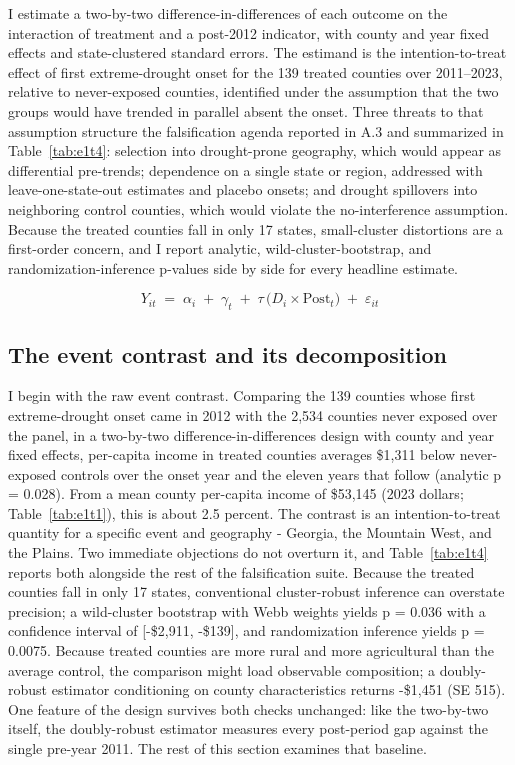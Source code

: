 \documentclass[a4paper,11pt]{article}
\begin{document}
I estimate a two-by-two difference-in-differences of each outcome on the interaction of treatment and a post-2012 indicator, with county and year fixed effects and state-clustered standard errors. The estimand is the intention-to-treat effect of first extreme-drought onset for the 139 treated counties over 2011--2023, relative to never-exposed counties, identified under the assumption that the two groups would have trended in parallel absent the onset. Three threats to that assumption structure the falsification agenda reported in A.3 and summarized in Table~\ref{tab:e1t4}: selection into drought-prone geography, which would appear as differential pre-trends; dependence on a single state or region, addressed with leave-one-state-out estimates and placebo onsets; and drought spillovers into neighboring control counties, which would violate the no-interference assumption. Because the treated counties fall in only 17 states, small-cluster distortions are a first-order concern, and I report analytic, wild-cluster-bootstrap, and randomization-inference p-values side by side for every headline estimate.

\begin{equation}
Y_{it} \;=\; \alpha_i \;+\; \gamma_t \;+\; \tau \,\bigl(D_i \times \mathrm{Post}_t\bigr)
\;+\; \varepsilon_{it}
\label{eq:did2x2}
\end{equation}

\FloatBarrier
\subsection{The event contrast and its decomposition}

I begin with the raw event contrast. Comparing the 139 counties whose first extreme-drought onset came in 2012 with the 2,534 counties never exposed over the panel, in a two-by-two difference-in-differences design with county and year fixed effects, per-capita income in treated counties averages \$1,311 below never-exposed controls over the onset year and the eleven years that follow (analytic p = 0.028). From a mean county per-capita income of \$53,145 (2023 dollars; Table~\ref{tab:e1t1}), this is about 2.5 percent. The contrast is an intention-to-treat quantity for a specific event and geography - Georgia, the Mountain West, and the Plains. Two immediate objections do not overturn it, and Table~\ref{tab:e1t4} reports both alongside the rest of the falsification suite. Because the treated counties fall in only 17 states, conventional cluster-robust inference can overstate precision; a wild-cluster bootstrap with Webb weights yields p = 0.036 with a confidence interval of [-\$2,911, -\$139], and randomization inference yields p = 0.0075. \citep{cameron2008bootstrap,mackinnonwebb2018wildbootstrap,young2019channelingfisher} Because treated counties are more rural and more agricultural than the average control, the comparison might load observable composition; a doubly-robust estimator conditioning on county characteristics returns -\$1,451 (SE 515). One feature of the design survives both checks unchanged: like the two-by-two itself, the doubly-robust estimator measures every post-period gap against the single pre-year 2011. The rest of this section examines that baseline.
\end{document}
